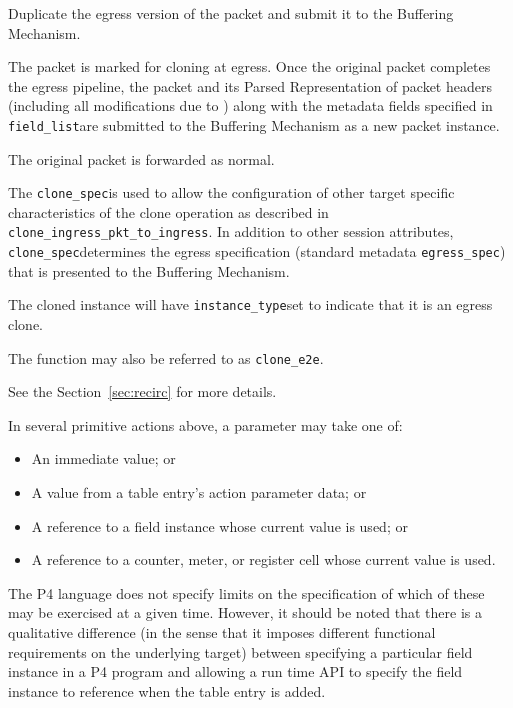 \documentclass[12pt]{article}
\begin{document}
{ %
Duplicate the egress version of the packet and submit it to the Buffering 
Mechanism.
}
{ %
}
{ %
The packet is marked for cloning at egress. Once the original packet completes 
the egress pipeline, the packet and its Parsed Representation of packet headers 
(including all modifications due to \matchaction) along with the metadata 
fields specified in \texttt{field_list}are submitted to the Buffering Mechanism as 
a new packet instance. 

The original packet is forwarded as normal.

The \texttt{clone_spec}is used to allow the configuration of other target specific 
characteristics of the clone operation as described in \texttt{clone_ingress_pkt_to_ingress}. 
In addition to other session attributes, \texttt{clone_spec}determines the egress 
specification (standard metadata \texttt{egress_spec}) that is presented to the 
Buffering Mechanism.

The cloned instance will have \texttt{instance_type}set to indicate that it is an 
egress clone. 

The function may also be referred to as \texttt{clone_e2e}.

See the Section~\ref{sec:recirc} for more details.
}



In several primitive actions above, a parameter may take one of:

\begin{itemize}
\item
An immediate value; or
\item
A value from a table entry's action parameter data; or
\item
A reference to a field instance whose current value is used; or
\item
A reference to a counter, meter, or register cell whose current value is used.
\end{itemize}

The P4 language does not specify limits on the specification of which of these 
may be exercised at a given time. However, it should be noted that there is 
a qualitative difference (in the sense that it imposes different functional 
requirements on the underlying target) between specifying a particular field 
instance in a P4 program and allowing a run time API to specify the field 
instance to reference when the table entry is added. 
\end{document}

